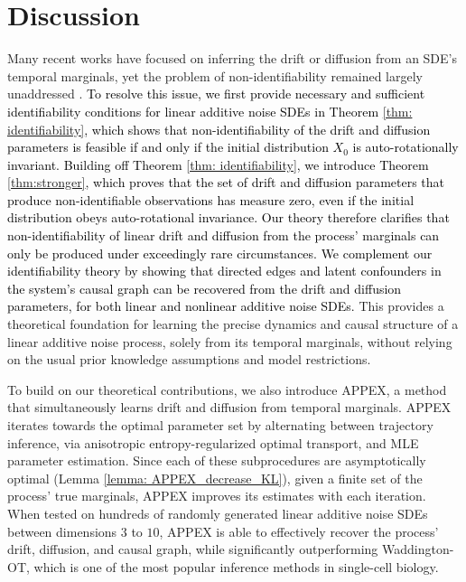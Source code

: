 \documentclass[twoside,11pt]{article}
\newcommand{\rv}[1]{\textcolor{black}{#1}}
\begin{document}
\section{Discussion}
\label{sec:Conclusions}
Many recent works have focused on inferring the drift or diffusion from an SDE's temporal marginals, yet the problem of non-identifiability remained largely unaddressed \citep{weinreb2018fundamental, lavenant2021towards, chizat2022trajectory, shen2024learning, zhang2024joint, terpin2024learning, brogat2024learning}. \rv{To resolve this issue, we first provide necessary and sufficient identifiability conditions for linear additive noise SDEs in Theorem \ref{thm: identifiability}, which shows that non-identifiability of the drift and diffusion parameters is feasible if and only if the initial distribution $X_0$ is auto-rotationally invariant. Building off Theorem \ref{thm: identifiability}, we introduce Theorem \ref{thm:stronger}, which proves that the set of drift and diffusion parameters that produce non-identifiable observations has measure zero, even if the initial distribution obeys auto-rotational invariance. Our theory therefore clarifies that non-identifiability of linear drift and diffusion from the process' marginals can only be produced under exceedingly rare circumstances. We complement our identifiability theory by showing that directed edges and latent confounders in the system's causal graph can be recovered from the drift and diffusion parameters, for both linear and nonlinear additive noise SDEs.} This provides a theoretical foundation for learning the precise dynamics and causal structure of a linear additive noise process, solely from its temporal marginals, without relying on the usual prior knowledge assumptions and model restrictions.

To build on our theoretical contributions, we also introduce APPEX, a method that simultaneously learns drift and diffusion from temporal marginals. APPEX iterates towards the optimal parameter set by alternating between trajectory inference, via anisotropic entropy-regularized optimal transport, and MLE parameter estimation. Since each of these subprocedures are asymptotically optimal (Lemma \ref{lemma: APPEX_decrease_KL}), given a finite set of the process' true marginals, APPEX improves its estimates with each iteration. When tested on hundreds of randomly generated linear additive noise SDEs between dimensions $3$ to $10$, APPEX is able to effectively recover the process' drift, diffusion, and causal graph, while significantly outperforming Waddington-OT, which is one of the most popular inference methods in single-cell biology. 
\end{document}
